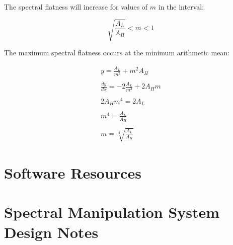 \begin{appendices}
		The spectral flatness will increase for values of $m$ in the interval:

		\[ \sqrt{\frac{A_{L}}{A_{H}}} < m < 1 \]

		The maximum spectral flatness occurs at the minimum arithmetic mean:

		\begin{gather}
			y = \frac{A_{L}}{m^{2}} + m^{2}A_{H} \nonumber \\
			\nonumber \\
			\frac{dy}{dx} = -2\frac{A_{L}}{m^{3}} + 2A_{H}m \nonumber \\
			\nonumber \\
			2A_{H}m^{4} = 2A_{L} \nonumber \\
			\nonumber \\
			m^{4} = \frac{A_{L}}{A_{H}} \nonumber \\
			\nonumber \\
			m = \sqrt[4]{\frac{A_{L}}{A_{H}}} \nonumber
		\end{gather}

\chapter{Software Resources}

\chapter{Spectral Manipulation System Design Notes}

\end{appendices}
